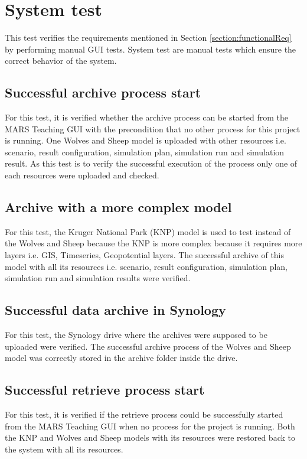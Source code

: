 \section{System test}
This test verifies the requirements mentioned in Section \ref{section:functionalReq} by performing manual GUI tests. System test are manual tests
which ensure the correct behavior of the system.

\subsection{Successful archive process start}
For this test, it is verified whether the archive process can be started from the MARS Teaching GUI with the precondition that no other process
for this project is running. One Wolves and Sheep model is uploaded with other resources i.e. scenario, result configuration,
simulation plan, simulation run and simulation result. As this test is to verify the successful execution of the process only one of each resources
were uploaded and checked.

\subsection{Archive with a more complex model}
For this test, the Kruger National Park (KNP) model is used to test instead of the Wolves and Sheep because the KNP is more complex because it requires more layers
i.e. GIS, Timeseries, Geopotential layers. The successful archive of this model with all its resources i.e. scenario, result configuration, simulation plan, simulation run
and simulation results were verified. 

\subsection{Successful data archive in Synology}
For this test, the Synology drive where the archives were supposed to be uploaded were verified. The successful archive process of the Wolves and Sheep model
was correctly stored in the archive folder inside the drive.

\subsection{Successful retrieve process start}
For this test, it is verified if the retrieve process could be successfully started from the MARS Teaching GUI when no process for the project is running.
Both the KNP and Wolves and Sheep models with its resources were restored back to the system with all its resources. 

